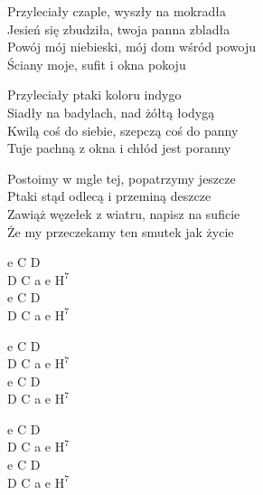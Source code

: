 \begin{text}
    Przyleciały czaple, wyszły na mokradła\\
    Jesień się zbudziła, twoja panna zbladła\\
    Powój mój niebieski, mój dom wśród powoju\\
    Ściany moje, sufit i okna pokoju

    Przyleciały ptaki koloru indygo\\
    Siadły na badylach, nad żółtą łodygą\\
    Kwilą coś do siebie, szepczą coś do panny\\
    Tuje pachną z okna i chłód jest poranny

    Postoimy w mgle tej, popatrzymy jeszcze\\
    Ptaki stąd odlecą i przeminą deszcze\\
    Zawiąż węzełek z wiatru, napisz na suficie\\
    Że my przeczekamy ten smutek jak życie
\end{text}
\begin{chord}
    e C D\\
    D C a e $\mathrm{H^{7}}$\\
    e C D\\
    D C a e $\mathrm{H^{7}}$

    e C D\\
    D C a e $\mathrm{H^{7}}$\\
    e C D\\
    D C a e $\mathrm{H^{7}}$

    e C D\\
    D C a e $\mathrm{H^{7}}$\\
    e C D\\
    D C a e $\mathrm{H^{7}}$
\end{chord}
